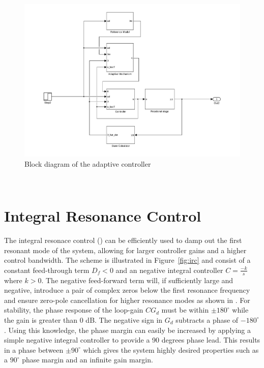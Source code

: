 \begin{figure}[h]
  \centering %
  \includegraphics[width=1\textwidth, trim=4cm 0cm 3.8cm 0cm, clip=true]{fig/matlab/adaptive_scheme}
  \caption{\label{fig:adaptive}Block diagram of the adaptive controller}
\end{figure}

\newpage~\newpage~
\FloatBarrier
\section{Integral Resonance Control}\label{sec:irc}
The integral resonace control (\abbrIRC) can be efficiently used to damp out the first resonant mode of the system, allowing for larger controller gains and a higher control bandwidth. The \abbrIRC scheme is illustrated in Figure~\ref{fig:irc} and consist of a constant feed-through term $D_f<0$ and an negative integral controller $C=\frac{-k}{s}$ where $k>0$. The negative feed-forward term will, if sufficiently large and negative, introduce a pair of complex zeros below the first resonance frequency and ensure zero-pole cancellation for higher resonance modes as shown in \citep{Aphale:2007}. For stability, the phase response of the loop-gain $CG_d$ must be within $\pm180^{\circ}$ while the gain is greater than 0 dB. The negative sign in $G_d$ subtracts a phase of $-180^{\circ}$. Using this knowledge, the phase margin can easily be increased by applying a simple negative integral controller to provide a 90 degrees phase lead. This results in a phase between $\pm90^{\circ}$ which gives the system highly desired properties such as a $90^{\circ}$ phase margin and an infinite gain margin.

